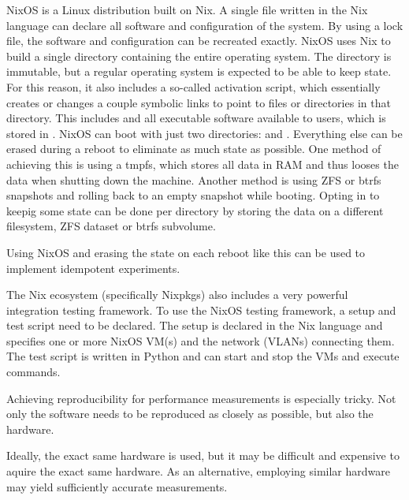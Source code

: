 NixOS is a Linux distribution built on Nix.
A single file written in the Nix language can declare all software and configuration of the system.
By using a lock file, the software and configuration can be recreated exactly.
NixOS uses Nix to build a single directory containing the entire operating system.
The directory is immutable, but a regular operating system is expected to be able to keep state.
For this reason, it also includes a so-called activation script, which essentially creates or changes a couple symbolic links to point to files or directories in that directory.
This includes  and all executable software available to users, which is stored in .
NixOS can boot with just two directories:  and  \cite{Erase_your_darlings}.
Everything else can be erased during a reboot to eliminate as much state as possible.
One method of achieving this is using a tmpfs, which stores all data in RAM and thus looses the data when shutting down the machine.
Another method is using ZFS or btrfs snapshots and rolling back to an empty snapshot while booting.
Opting in to keepig some state can be done per directory by storing the data on a different filesystem, ZFS dataset or btrfs subvolume.

Using NixOS and erasing the state on each reboot like this can be used to implement idempotent experiments.

The Nix ecosystem (specifically Nixpkgs) also includes a very powerful integration testing framework.
To use the NixOS testing framework, a setup and test script need to be declared.
The setup is declared in the Nix language and specifies one or more NixOS VM(s) and the network (VLANs) connecting them.
The test script is written in Python and can start and stop the VMs and execute commands.

Achieving reproducibility for performance measurements is especially tricky.
Not only the software needs to be reproduced as closely as possible, but also the hardware.

Ideally, the exact same hardware is used, but it may be difficult and expensive to aquire the exact same hardware.
As an alternative, employing similar hardware may yield sufficiently accurate measurements.